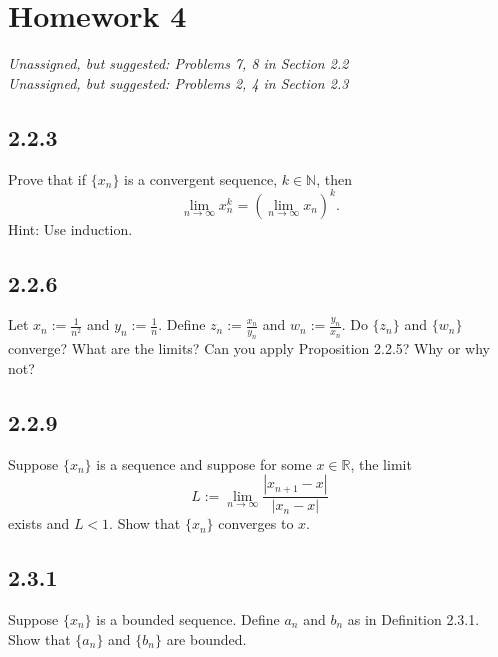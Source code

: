 \documentclass{article}
\newcommand{\hwnum}{4}
\newcommand{\unassigned}{
\flushleft Unassigned, but suggested: Problems 7, 8 in Section 2.2\\
Unassigned, but suggested: Problems 2, 4 in Section 2.3 }
\newcommand{\R}{{\mathbb{R}}}
\newcommand{\N}{{\mathbb{N}}}
\newcommand{\abs}[1]{\left\lvert {#1} \right\rvert}
\begin{document}
\setcounter{section}{\hwnum - 1}
\section{Homework \hwnum}
\emph{ \unassigned}


\subsection{2.2.3}Prove that if $\{ x_n \}$ is a convergent sequence, $k \in \N$, then
\begin{equation*}
\lim_{n\to\infty} x_n^k = 
{\left( \lim_{n\to\infty} x_n \right)}^k .
\end{equation*}
Hint: Use {induction}.

\mysolution{

} %


\subsection{2.2.6}Let $x_n := \frac{1}{n^2}$ and $y_n := \frac{1}{n}$.  Define
$z_n := \frac{x_n}{y_n}$ and 
$w_n := \frac{y_n}{x_n}$.  Do $\{ z_n \}$ and $\{ w_n \}$
converge?  What are the limits?  Can you apply Proposition 2.2.5?
Why or why not?

\mysolution{

} %


\subsection{2.2.9}Suppose $\{ x_n \}$ is a sequence and suppose for
some $x \in \R$, the limit
\begin{equation*}
L := \lim_{n \to \infty} \frac{\abs{x_{n+1}-x}}{\abs{x_n-x}}
\end{equation*}
exists and $L < 1$.  Show that $\{ x_n \}$ converges to $x$.

\mysolution{

} %



\subsection{2.3.1}Suppose $\{ x_n \}$ is a bounded sequence.  Define $a_n$ and
$b_n$ as in Definition 2.3.1.  Show that $\{ a_n \}$
and $\{ b_n \}$ are bounded.
\end{document}
